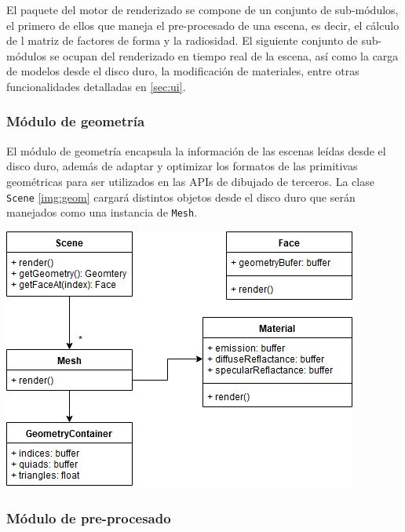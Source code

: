 El paquete del motor de renderizado se compone de un conjunto de sub-módulos, el primero de ellos que maneja el pre-procesado de una escena, es decir, el cálculo de l matriz de factores de forma y la radiosidad. El siguiente conjunto de sub-módulos se ocupan del renderizado en tiempo real de la escena, así como la carga de modelos desde el disco duro, la modificación de materiales, entre otras funcionalidades detalladas en \ref{sec:ui}.

\subsubsection{Módulo de geometría}

El módulo de geometría encapsula la información de las escenas leídas desde el disco duro, además de adaptar y optimizar los formatos de las primitivas geométricas para ser utilizados en las APIs de dibujado de terceros. La clase \verb|Scene| \ref{img:geom} cargará distintos objetos desde el disco duro que serán manejados como una instancia de \verb|Mesh|.


\vspace{5mm}
\begin{minipage}[h]{0.7\linewidth}
	\centering
	\includegraphics[width=\linewidth]{assets/geometry}
	\label{img:geom}
\end{minipage}

\subsubsection{Módulo de pre-procesado}

